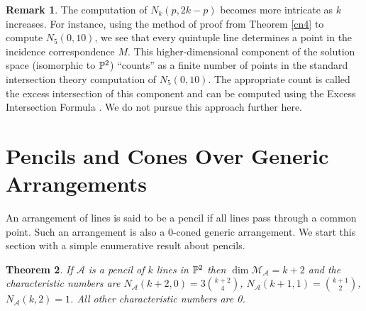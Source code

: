 \documentclass[12pt]{article}
\theoremstyle{plain}
\newtheorem{theorem}{Theorem}
\theoremstyle{definition}
\newtheorem{remark}[theorem]{Remark}
\newcommand{\A}{\mathcal{A}}
\newcommand{\M}{\mathcal{M}}
\newcommand{\N}{N}
\newcommand{\MLA}{\M_{\A}}
\renewcommand{\P}{\ensuremath \mathbb{P}}
\begin{document}
\begin{remark}
  The
  computation of $N_k(p,2k-p)$ becomes more intricate as $k$ increases. For instance,
  using the method of proof from Theorem \ref{cn4} to compute
  $N_5(0,10)$, we see that every quintuple line determines a point in
  the incidence correspondence $M$. This higher-dimensional component
  of the solution space (isomorphic to $\P^2$) ``counts'' as a finite number of points in the
  standard intersection theory computation of $N_5(0,10)$. The
  appropriate count is called the excess intersection of this
  component and can be computed using the Excess
  Intersection Formula \cite[section 6.3]{Fulton}. We do not pursue
  this approach further here. 

\end{remark}

\section{Pencils and Cones Over Generic Arrangements}
\label{section:dconed} 

An arrangement of lines is said to be a pencil if all lines pass
through a common point. Such an arrangement is also a $0$-coned
generic arrangement. We start this section with a simple enumerative
result about pencils.

\begin{theorem}
If $\A$ is a pencil of $k$ lines in $\P^2$ then $\dim \MLA = k+2$ and
the characteristic numbers are $\N_\A(k+2,0) = 3\binom{k+2}{4}$,
$\N_\A(k+1,1) = \binom{k+1}{2}$, $\N_\A(k,2)=1$. All other
characteristic numbers are 0.  
\end{theorem}
\end{document}
